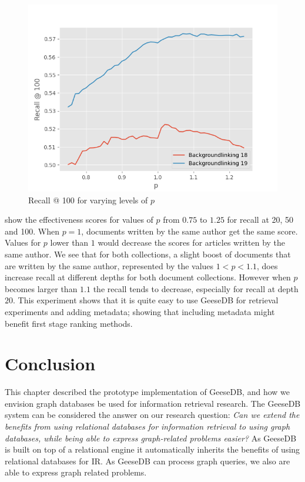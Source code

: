 \begin{figure}
	\centering
	\includegraphics[width=0.9\linewidth]{./imgs/recall-100-geesedb.png}
	\caption{Recall @ 100 for varying levels of $p$}
	\label{geesedb-recall-100}
\end{figure}

 show the effectiveness scores for values of $p$ from $0.75$ to $1.25$ for recall at 20, 50 and 100. When $p = 1$, documents written by the same author get the same score. Values for $p$ lower than $1$ would decrease the scores for articles written by the same author.  
We see that for both collections, a slight boost of documents that are written by the same author, represented by the values $1 < p < 1.1$, does increase recall at different depths for both document collections.  However when $p$ becomes larger than $1.1$ the recall tends to decrease, especially for recall at depth $20$. 
This experiment shows that it is quite easy to use GeeseDB for retrieval experiments and adding metadata; showing that including metadata might benefit first stage ranking methods.

\section{Conclusion}
This chapter described the prototype implementation of GeeseDB, and how we envision graph databases be used for information retrieval research.
The GeeseDB system can be considered the answer on our research question: \emph{Can we extend the benefits from using relational databases for information retrieval to using graph databases, while being able to express graph-related problems easier?}
As GeeseDB is built on top of a relational engine it automatically inherits the benefits of using relational databases for IR. As GeeseDB can process graph queries, we also are able to express graph related problems. 

